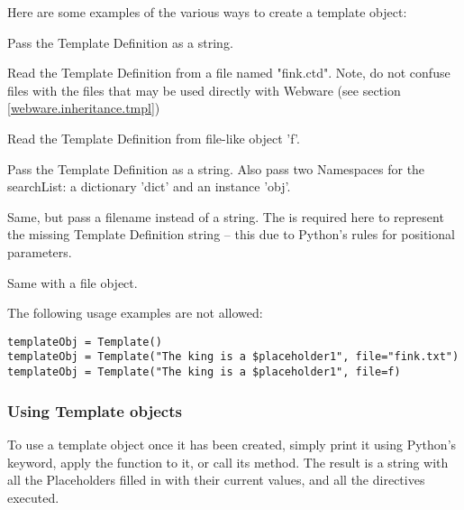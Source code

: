 Here are some examples of the various ways to create a template object:
\begin{description}
\item{}
     Pass the Template Definition as a string.
\item{}
     Read the Template Definition from a file named "fink.ctd".  Note, do not
     confuse  files with the  files that may be used
     directly with Webware (see section \ref{webware.inheritance.tmpl})
\item{}
     Read the Template Definition from file-like object 'f'.
\item{}
     Pass the Template Definition as a string.  Also pass two Namespaces for the
     searchList: a dictionary 'dict' and an instance 'obj'.
\item{}
     Same, but pass a filename instead of a string.  The  is required
     here to represent the missing Template Definition string -- this due to
     Python's rules for positional parameters.
\item{}
     Same with a file object.
\end{description}

The following usage examples are not allowed:
\begin{verbatim}
templateObj = Template() 
templateObj = Template("The king is a $placeholder1", file="fink.txt")
templateObj = Template("The king is a $placeholder1", file=f)
\end{verbatim}

\subsubsection{Using Template objects}
\label{puttingItTogether.template.using}

To use a template object once it has been created, simply print it using
Python's  keyword, apply the  function to it, or call
its  method.  The result is a string with all the Placeholders
filled in with their current values, and all the directives executed.

